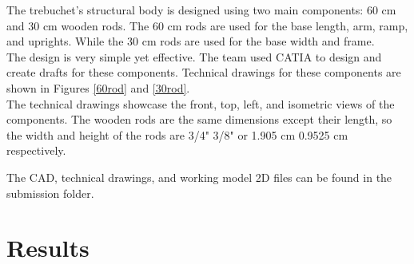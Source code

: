 \documentclass[12pt, titlepage]{article}
\begin{document}
    The trebuchet's structural body is designed using two main components: 60 cm and 30 cm wooden
    rods. The 60 cm rods are used for the base length, arm, ramp, and uprights. While 
    the 30 cm rods are used for the base width and frame. \\[10pt]
    The design is very simple yet effective. The team used CATIA to design 
    and create drafts for these components. Technical drawings for these 
    components are shown in Figures \ref{60rod} and \ref{30rod}.\\[10pt]
    The technical drawings showcase the front, top, left, and isometric views of the components.
    The wooden rods are the same dimensions except their length, so the width and height 
    of the rods are 3/4" 3/8" or 1.905 cm 0.9525 cm respectively.\\[120pt]
    \begin{bfseries}
    The CAD, technical drawings, and working model 2D files can be found in 
    the submission folder.
    \end{bfseries}
    \newpage
    \section{Results}
\end{document}
